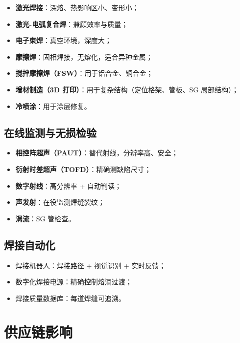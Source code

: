 \documentclass[
  UTF8,
  scheme=plain,
  fontsize=10pt,
  openany
]{ctexbook}
\begin{document}
\begin{itemize}
\tightlist
\item
  \textbf{激光焊接}：深熔、热影响区小、变形小；
\item
  \textbf{激光-电弧复合焊}：兼顾效率与质量；
\item
  \textbf{电子束焊}：真空环境，深度大；
\item
  \textbf{摩擦焊}：固相焊接，无熔化，适合异种金属；
\item
  \textbf{搅拌摩擦焊（FSW）}：用于铝合金、铜合金；
\item
  \textbf{增材制造（3D 打印）}：用于复杂结构（定位格架、管板、SG
  局部结构）；
\item
  \textbf{冷喷涂}：用于涂层修复。
\end{itemize}

\subsection{在线监测与无损检验}\label{ux5728ux7ebfux76d1ux6d4bux4e0eux65e0ux635fux68c0ux9a8c}

\begin{itemize}
\tightlist
\item
  \textbf{相控阵超声（PAUT）}：替代射线，分辨率高、安全；
\item
  \textbf{衍射时差超声（TOFD）}：精确测缺陷尺寸；
\item
  \textbf{数字射线}：高分辨率 + 自动判读；
\item
  \textbf{声发射}：在役监测焊缝裂纹；
\item
  \textbf{涡流}：SG 管检查。
\end{itemize}

\subsection{焊接自动化}\label{ux710aux63a5ux81eaux52a8ux5316}

\begin{itemize}
\tightlist
\item
  焊接机器人：焊接路径 + 视觉识别 + 实时反馈；
\item
  数字化焊接电源：精确控制熔滴过渡；
\item
  焊接质量数据库：每道焊缝可追溯。
\end{itemize}

\section{供应链影响}\label{ux4f9bux5e94ux94feux5f71ux54cd}
\end{document}
